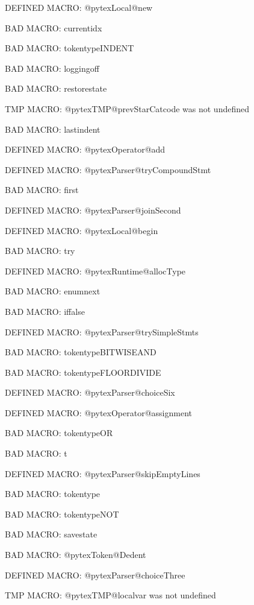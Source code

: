 \ifx\@pytexLocal@new\undefined\else DEFINED MACRO: @pytexLocal@new
\fi

BAD MACRO: currentidx

BAD MACRO: tokentypeINDENT

BAD MACRO: loggingoff

BAD MACRO: restorestate

\ifx\@pytexTMP@prevStarCatcode\undefined\else TMP MACRO: @pytexTMP@prevStarCatcode was not undefined
\fi

BAD MACRO: lastindent

\ifx\@pytexOperator@add\undefined\else DEFINED MACRO: @pytexOperator@add
\fi

\ifx\@pytexParser@tryCompoundStmt\undefined\else DEFINED MACRO: @pytexParser@tryCompoundStmt
\fi

BAD MACRO: first

\ifx\@pytexParser@joinSecond\undefined\else DEFINED MACRO: @pytexParser@joinSecond
\fi

\ifx\@pytexLocal@begin\undefined\else DEFINED MACRO: @pytexLocal@begin
\fi

BAD MACRO: try

\ifx\@pytexRuntime@allocType\undefined\else DEFINED MACRO: @pytexRuntime@allocType
\fi

BAD MACRO: enumnext

BAD MACRO: iffalse

\ifx\@pytexParser@trySimpleStmts\undefined\else DEFINED MACRO: @pytexParser@trySimpleStmts
\fi

BAD MACRO: tokentypeBITWISEAND

BAD MACRO: tokentypeFLOORDIVIDE

\ifx\@pytexParser@choiceSix\undefined\else DEFINED MACRO: @pytexParser@choiceSix
\fi

\ifx\@pytexOperator@assignment\undefined\else DEFINED MACRO: @pytexOperator@assignment
\fi

BAD MACRO: tokentypeOR

BAD MACRO: t

\ifx\@pytexParser@skipEmptyLines\undefined\else DEFINED MACRO: @pytexParser@skipEmptyLines
\fi

BAD MACRO: tokentype

BAD MACRO: tokentypeNOT

BAD MACRO: savestate

BAD MACRO: @pytexToken@Dedent

\ifx\@pytexParser@choiceThree\undefined\else DEFINED MACRO: @pytexParser@choiceThree
\fi

\ifx\@pytexTMP@localvar\undefined\else TMP MACRO: @pytexTMP@localvar was not undefined
\fi

